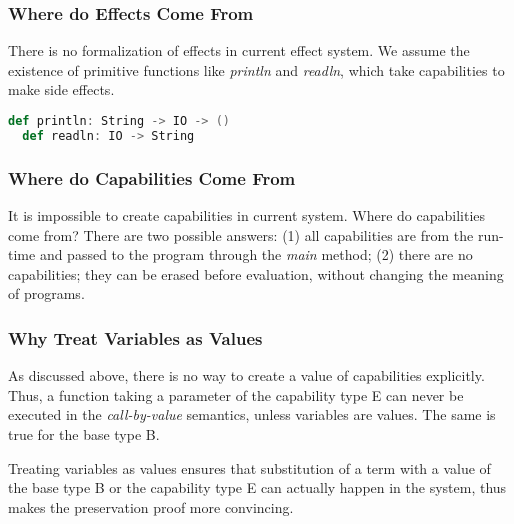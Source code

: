 
\subsubsection{Where do Effects Come From}

There is no formalization of effects in current effect system. We
assume the existence of primitive functions like \emph{println} and
\emph{readln}, which take capabilities to make side effects.

\begin{lstlisting}[language=Scala]
  def println: String -> IO -> ()
  def readln: IO -> String
\end{lstlisting}



\subsubsection{Where do Capabilities Come From}

It is impossible to create capabilities in current system. Where do
capabilities come from?  There are two possible answers: (1) all
capabilities are from the run-time and passed to the program through
the \emph{main} method; (2) there are no capabilities; they can be
erased before evaluation, without changing the meaning of programs.


\subsubsection{Why Treat Variables as Values}

As discussed above, there is no way to create a value of capabilities
explicitly. Thus, a function taking a parameter of the capability type
E can never be executed in the \emph{call-by-value} semantics, unless
variables are values. The same is true for the base type B.

Treating variables as values ensures that substitution of a term with
a value of the base type B or the capability type E can actually
happen in the system, thus makes the preservation proof more
convincing.

